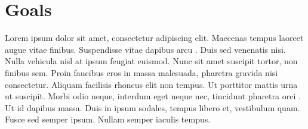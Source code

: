 \section*{Goals}
Lorem ipsum dolor sit amet, consectetur adipiscing elit. Maecenas tempus laoreet augue vitae finibus. Suspendisse vitae dapibus arcu \cite{einstein}. Duis sed venenatis nisi. Nulla vehicula nisl at ipsum feugiat euismod. Nunc sit amet suscipit tortor, non finibus sem. Proin faucibus eros in massa malesuada, pharetra gravida nisi consectetur. Aliquam facilisis rhoncus elit non tempus. Ut porttitor mattis urna ut suscipit. Morbi odio neque, interdum eget neque nec, tincidunt pharetra orci \cite{latexcompanion}. Ut id dapibus massa. Duis in ipsum sodales, tempus libero et, vestibulum quam. Fusce sed semper ipsum. Nullam semper iaculis tempus. 